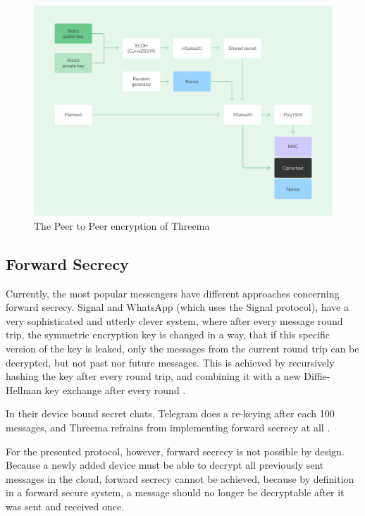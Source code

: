 \documentclass[a4paper, oneside]{discothesis}
\begin{document}
\begin{figure}[h!]
    \centering
    \includegraphics[width=\columnwidth]{figures/threema.png}
    \caption{The Peer to Peer encryption of Threema}
    \label{fig:peer_encryption}
\end{figure}

\subsection{Forward Secrecy}
\label{sec:forward_secrecy}

Currently, the most popular messengers have different approaches concerning forward secrecy. Signal and WhatsApp (which uses the Signal protocol), have a very sophisticated and utterly clever system, where after every message round trip, the symmetric encryption key is changed in a way, that if this specific version of the key is leaked, only the messages from the current round trip can be decrypted, but not past nor future messages. This is achieved by recursively hashing the key after every round trip, and combining it with a new Diffie-Hellman key exchange after every round \cite{DoubleRatchet}.

In their device bound secret chats, Telegram does a re-keying after each 100 messages, and Threema refrains from implementing forward secrecy at all \cite{Threema}.

For the presented protocol, however, forward secrecy is not possible by design. Because a newly added device must be able to decrypt all previously sent messages in the cloud, forward secrecy cannot be achieved, because by definition in a forward secure system, a message should no longer be decryptable after it was sent and received once.
\end{document}
